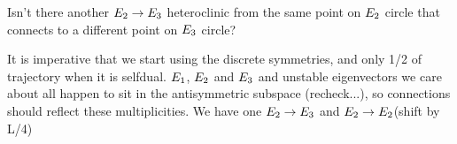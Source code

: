 
Isn't there another $ E_{2} \to E_{3} $ heteroclinic
from the same point on  $E_{2} $ circle that connects to a different point on
$E_{3}$ circle?

It is imperative that we start using the discrete symmetries, and only 1/2
of trajectory when it is selfdual. $E_{1}$, $E_{2}$ and $E_{3}$ and unstable eigenvectors
we care about all happen to sit in the antisymmetric subspace
(recheck...), so connections should reflect these multiplicities. We have
one $E_{2} \to E_{3}$ and $E_{2} \to E_{2}$(shift by L/4)




